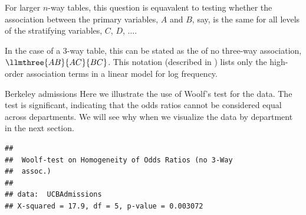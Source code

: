 \documentclass[11pt]{book}
\renewenvironment{knitrout}{\small\renewcommand{\baselinestretch}{.85}}{} %
\begin{document}
For larger $n$-way tables,
this question is equavalent to testing whether the association
between the primary variables, $A$ and $B$, say, is the same for
all levels of the stratifying variables, $C$, $D$, $\dots$.

In the case of a 3-way table, this can be stated as the
 of no three-way association,
$\llmthree{AB}{AC}{BC}$.
This notation (described in )
lists only the high-order association
terms in a linear model for log frequency.

\begin{Example}[berkeley1a]{Berkeley admissions}
Here we illustrate the use of Woolf's test for the  data.
The test is significant, indicating that the odds ratios cannot be considered
equal across departments.  We will see why when we visualize the data
by department in the next section.
\begin{knitrout}
\color{fgcolor}\begin{kframe}
\begin{alltt}
\end{alltt}
\begin{verbatim}
## 
## 	Woolf-test on Homogeneity of Odds Ratios (no 3-Way
## 	assoc.)
## 
## data:  UCBAdmissions
## X-squared = 17.9, df = 5, p-value = 0.003072
\end{verbatim}
\end{kframe}
\end{knitrout}

\end{Example}
\end{document}
